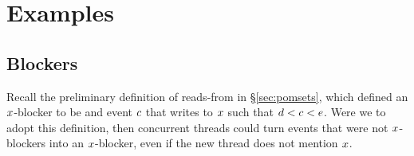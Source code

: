 \section{Examples}
\label{sec:examples}

\subsection{Blockers}
\label{app:blockers}

Recall the preliminary definition of reads-from in \S\ref{sec:pomsets}, which
defined an $x$-blocker to be and event $c$ that writes to $x$ such that
$d < c < e$.  Were we to adopt this definition, then concurrent
threads could turn events that were not $x$-blockers into an
$x$-blocker, even if the new thread does not mention $x$.

